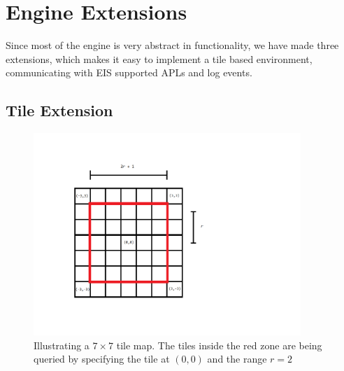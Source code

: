 
\section{Engine Extensions}

Since most of the engine is very abstract in functionality, we have
made three extensions, which makes it easy to implement a tile based
environment, communicating with EIS supported APLs and log events.


\subsection{Tile Extension}

\begin{figure}
\begin{centering}
\includegraphics[width=0.9\textwidth]{tilemap}
\par\end{centering}

\caption{Illustrating a $7\times7$ tile map. The tiles inside the red zone
are being queried by specifying the tile at $(0,0)$ and the range
$r=2$\label{fig:TileWorldIlustrationInTileExtension}}


\end{figure}


